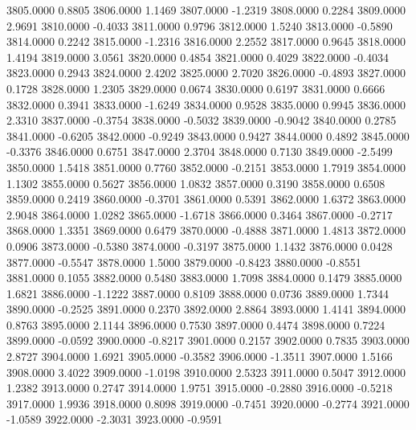 3805.0000      0.8805
3806.0000      1.1469
3807.0000     -1.2319
3808.0000      0.2284
3809.0000      2.9691
3810.0000     -0.4033
3811.0000      0.9796
3812.0000      1.5240
3813.0000     -0.5890
3814.0000      0.2242
3815.0000     -1.2316
3816.0000      2.2552
3817.0000      0.9645
3818.0000      1.4194
3819.0000      3.0561
3820.0000      0.4854
3821.0000      0.4029
3822.0000     -0.4034
3823.0000      0.2943
3824.0000      2.4202
3825.0000      2.7020
3826.0000     -0.4893
3827.0000      0.1728
3828.0000      1.2305
3829.0000      0.0674
3830.0000      0.6197
3831.0000      0.6666
3832.0000      0.3941
3833.0000     -1.6249
3834.0000      0.9528
3835.0000      0.9945
3836.0000      2.3310
3837.0000     -0.3754
3838.0000     -0.5032
3839.0000     -0.9042
3840.0000      0.2785
3841.0000     -0.6205
3842.0000     -0.9249
3843.0000      0.9427
3844.0000      0.4892
3845.0000     -0.3376
3846.0000      0.6751
3847.0000      2.3704
3848.0000      0.7130
3849.0000     -2.5499
3850.0000      1.5418
3851.0000      0.7760
3852.0000     -0.2151
3853.0000      1.7919
3854.0000      1.1302
3855.0000      0.5627
3856.0000      1.0832
3857.0000      0.3190
3858.0000      0.6508
3859.0000      0.2419
3860.0000     -0.3701
3861.0000      0.5391
3862.0000      1.6372
3863.0000      2.9048
3864.0000      1.0282
3865.0000     -1.6718
3866.0000      0.3464
3867.0000     -0.2717
3868.0000      1.3351
3869.0000      0.6479
3870.0000     -0.4888
3871.0000      1.4813
3872.0000      0.0906
3873.0000     -0.5380
3874.0000     -0.3197
3875.0000      1.1432
3876.0000      0.0428
3877.0000     -0.5547
3878.0000      1.5000
3879.0000     -0.8423
3880.0000     -0.8551
3881.0000      0.1055
3882.0000      0.5480
3883.0000      1.7098
3884.0000      0.1479
3885.0000      1.6821
3886.0000     -1.1222
3887.0000      0.8109
3888.0000      0.0736
3889.0000      1.7344
3890.0000     -0.2525
3891.0000      0.2370
3892.0000      2.8864
3893.0000      1.4141
3894.0000      0.8763
3895.0000      2.1144
3896.0000      0.7530
3897.0000      0.4474
3898.0000      0.7224
3899.0000     -0.0592
3900.0000     -0.8217
3901.0000      0.2157
3902.0000      0.7835
3903.0000      2.8727
3904.0000      1.6921
3905.0000     -0.3582
3906.0000     -1.3511
3907.0000      1.5166
3908.0000      3.4022
3909.0000     -1.0198
3910.0000      2.5323
3911.0000      0.5047
3912.0000      1.2382
3913.0000      0.2747
3914.0000      1.9751
3915.0000     -0.2880
3916.0000     -0.5218
3917.0000      1.9936
3918.0000      0.8098
3919.0000     -0.7451
3920.0000     -0.2774
3921.0000     -1.0589
3922.0000     -2.3031
3923.0000     -0.9591
